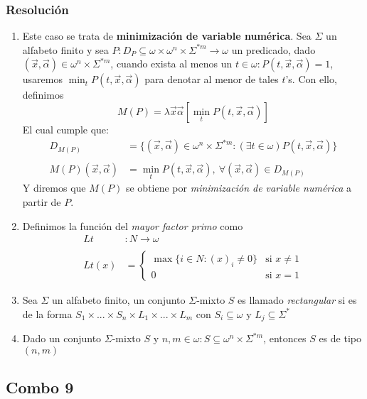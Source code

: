 \documentclass[
]{article}
\providecommand{\tightlist}{%
  \setlength{\itemsep}{0pt}\setlength{\parskip}{0pt}}
\begin{document}
\subsubsection{Resolución}\label{resoluciuxf3n-7}

\begin{enumerate}
\def\labelenumi{\arabic{enumi}.}
\tightlist
\item
  Este caso se trata de \textbf{minimización de variable numérica}. Sea
  \(\Sigma\) un alfabeto finito y sea
  \(P:D_P\subseteq\omega\times\omega^n\times\Sigma^{*m}\to\omega\) un
  predicado, dado
  \((\vec{x},\vec{\alpha})\in\omega^n\times\Sigma^{*m}\), cuando exista
  al menos un \(t\in\omega:P(t,\vec{x},\vec{\alpha})=1\), usaremos
  \(\min_t P(t,\vec{x},\vec{\alpha})\) para denotar al menor de tales
  \(t\)'s. Con ello, definimos
  \[M(P)=\lambda\vec{x}\vec{\alpha}\left[\min_t P(t,\vec{x},\vec{\alpha})\right]\]
  El cual cumple que:
  \[\begin{aligned} D_{M(P)}&=\{(\vec{x},\vec{\alpha})\in\omega^n\times\Sigma^{*m}:(\exists t\in\omega) P(t,\vec{x},\vec{\alpha})\}\\ \\ M(P)(\vec{x},\vec{\alpha})&=\min_t P(t,\vec{x},\vec{\alpha}),\ \forall(\vec{x},\vec{\alpha})\in D_{M(P)}\end{aligned}\]
  Y diremos que \(M(P)\) se obtiene por \emph{minimización de variable
  numérica} a partir de \(P\).
\item
  Definimos la función del \emph{mayor factor primo} como
  \[\begin{aligned}Lt&:N\to\omega\\ \\ Lt(x)&=\begin{cases}\max\{i\in N:(x)_i\neq 0\} &\text{si }x\neq 1\\ 0 &\text{si }x=1\end{cases} \end{aligned}\]
\item
  Sea \(\Sigma\) un alfabeto finito, un conjunto \(\Sigma\)-mixto \(S\)
  es llamado \emph{rectangular} si es de la forma
  \(S_1\times ...\times S_n\times L_1\times ...\times L_m\) con
  \(S_i\subseteq\omega\) y \(L_j\subseteq\Sigma^*\)
\item
  Dado un conjunto \(\Sigma\)-mixto \(S\) y
  \(n,m\in\omega:S\subseteq\omega^n\times\Sigma^{*m}\), entonces \(S\)
  es de tipo \((n,m)\)
\end{enumerate}

\subsection{Combo 9}\label{combo-9}
\end{document}
